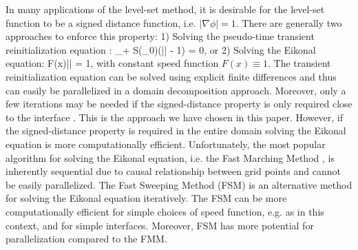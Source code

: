 In many applications of the level-set method, it is desirable for the level-set function to be a signed distance function, i.e. $|\nabla \phi| = 1$. There are generally two approaches to enforce this property: 1) Solving the pseudo-time transient reinitialization equation \cite{Sussman;Smereka;Osher:94:A-Level-Set-Approach, Osher;Fedkiw:01:Level-Set-Methods:-A}:
\ben
\phi_\tau + S(\phi_0)\left(|\nabla \phi| - 1\right) = 0,
\een
or 2) Solving the Eikonal equation:
\ben
F(x)|\nabla\phi| = 1,
\een 
with constant speed function $F(x) \equiv 1$. The transient reinitialization equation can be solved using explicit finite differences and thus can easily be parallelized in a domain decomposition approach. Moreover, only a few iterations may be needed if the signed-distance property is only required close to the interface \cite{Min;Gibou:07:A-second-order-accur}. This is the approach we have chosen in this paper. However, if the signed-distance property is required in the entire domain solving the Eikonal equation is more computationally efficient. Unfortunately, the most popular algorithm for solving the Eikonal equation, i.e. the Fast Marching Method \cite{Sethian:96:A-Fast-Marching-Leve,Sethian:99:Level-set-methods-an}, is inherently sequential due to causal relationship between grid points and cannot be easily parallelized. The Fast Sweeping Method (FSM) \cite{Zhao:05:A-fast-sweeping-meth} is an alternative method for solving the Eikonal equation iteratively. The FSM can be more computationally efficient for simple choices of speed function, e.g. as in this context, and for simple interfaces. Moreover, FSM has more potential for parallelization compared to the FMM.

